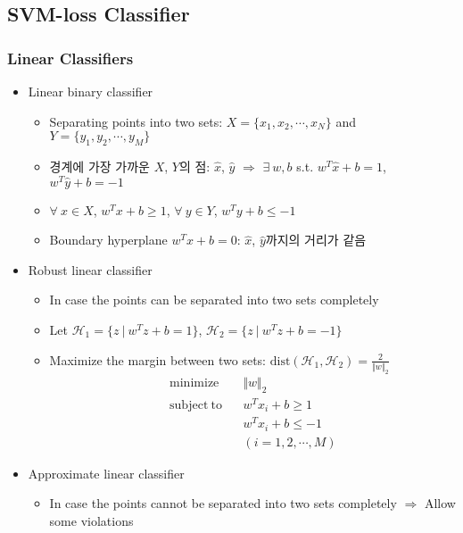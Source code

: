\subsection{SVM-loss Classifier}

\subsubsection*{Linear Classifiers}
\begin{itemize}
    \item Linear binary classifier
    \begin{itemize}
        \item Separating points into two sets: $X=\{x_1,x_2,\cdots,x_N\}$ and $Y=\{y_1,y_2,\cdots,y_M\}$
        \item 경계에 가장 가까운 $X$, $Y$의 점: $\hat{x}$, $\hat{y}$ $\Rightarrow$ $\exists~w,b$ s.t. $w^T\hat{x}+b=1$, $w^T\hat{y}+b=-1$
        \item $\forall~x\in X$, $w^Tx+b\geq1$, $\forall~y\in Y$, $w^Ty+b\leq-1$
        \item Boundary hyperplane $w^Tx+b=0$: $\hat{x}$, $\hat{y}$까지의 거리가 같음
    \end{itemize}
    \item Robust linear classifier
    \begin{itemize}
        \item In case the points can be separated into two sets completely
        \item Let $\mathcal{H}_1=\{z~|~w^Tz+b=1\}$, $\mathcal{H}_2=\{z~|~w^Tz+b=-1\}$
        \item Maximize the margin between two sets: $\mathrm{dist}(\mathcal{H}_1,\mathcal{H}_2)=\frac{2}{\Vert w\Vert_2}$
        \begin{equation}\begin{aligned}
            \mathrm{minimize}~~&~~\Vert w\Vert_2 \\
            \mathrm{subject~to}~~&~~w^Tx_i+b\geq1\\
                &~~w^Tx_i+b\leq-1\\
                &~~(i=1,2,\cdots,M)
        \end{aligned}\end{equation}
    \end{itemize}
    \item Approximate linear classifier
    \begin{itemize}
        \item In case the points cannot be separated into two sets completely $\Rightarrow$ Allow some violations

\end{itemize}
\end{itemize}
